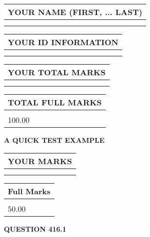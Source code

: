 \documentclass[12pt]{article}
\begin{document}
 
 
 
 
   
   
\newpage 
\setcounter{page}{ 
   416001 } 
   
   
   
   
\noindent\begin{tabular}{|l|}
\hline
YOUR NAME (FIRST, ... LAST)  \\
\hline
 \\ 
 \\ 
\hline
\end{tabular}
\hspace{0.05in} \begin{tabular}{|l|}
\hline
 YOUR   ID   INFORMATION  \\
\hline
 \\ 
 \\ 
\hline
\end{tabular}
   
   
\vspace{0.2in}\noindent\begin{tabular}{|l|}
\hline
YOUR TOTAL MARKS  \\
\hline
 \\ 
 \\ 
\hline
\end{tabular}
\hspace{0.05in} \begin{tabular}{|l|}
\hline
TOTAL FULL MARKS  \\
\hline
 \\ 
100.00 \\
\hline
\end{tabular}
   
   
 \vspace{0.2in}
{\LARGE {\textbf{ A QUICK TEST EXAMPLE}}}
   
   
  
\vspace{0.2in}
  
\noindent\begin{tabular}{|l|}
\hline
 YOUR MARKS  \\
\hline
 \\ 
 \\ 
\hline
\end{tabular}
\hspace{0.05in} \begin{tabular}{|l|}
\hline
 Full Marks  \\
\hline
 \\ 
50.00 \\
\hline
\end{tabular}
{\textbf{\Large{QUESTION
416.1 
}}}
  
\end{document}
